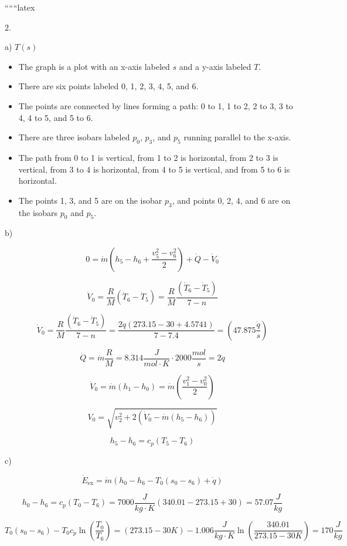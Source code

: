 
``````latex


2.

a) \( T(s) \)

\begin{itemize}
    \item The graph is a plot with an x-axis labeled \( s \) and a y-axis labeled \( T \).
    \item There are six points labeled 0, 1, 2, 3, 4, 5, and 6.
    \item The points are connected by lines forming a path: 0 to 1, 1 to 2, 2 to 3, 3 to 4, 4 to 5, and 5 to 6.
    \item There are three isobars labeled \( p_0 \), \( p_3 \), and \( p_5 \) running parallel to the x-axis.
    \item The path from 0 to 1 is vertical, from 1 to 2 is horizontal, from 2 to 3 is vertical, from 3 to 4 is horizontal, from 4 to 5 is vertical, and from 5 to 6 is horizontal.
    \item The points 1, 3, and 5 are on the isobar \( p_3 \), and points 0, 2, 4, and 6 are on the isobars \( p_0 \) and \( p_5 \).
\end{itemize}

b)

\[
0 = \dot{m} (h_5 - h_6 + \frac{v_5^2 - v_6^2}{2}) + \dot{Q} - \dot{V}_0
\]

\[
\dot{V}_0 = \frac{R}{M} (\dot{T}_6 - \dot{T}_5) = \frac{R}{M} \frac{(\dot{T}_6 - \dot{T}_5)}{7 - n}
\]

\[
\dot{V}_0 = \frac{R}{M} \frac{(\dot{T}_6 - \dot{T}_5)}{7 - n} = \frac{2 \dot{q} (273.15 - 30 + 4.5741)}{7 - 7.4} = (47.875 \frac{\dot{q}}{s})
\]

\[
\dot{Q} = \dot{m} \frac{R}{M} = 8.314 \frac{J}{mol \cdot K} \cdot 2000 \frac{mol}{s} = 2 \dot{q}
\]

\[
\dot{V}_0 = \dot{m} (h_1 - h_0) = \dot{m} (\frac{v_1^2 - v_0^2}{2})
\]

\[
V_0 = \sqrt{v_2^2 + 2 (\dot{V}_0 - \dot{m} (h_5 - h_6))}
\]

\[
h_5 - h_6 = c_p (T_5 - T_6)
\]

c)

\[
\dot{E}_{\text{ex}} = \dot{m} (h_0 - h_6 - T_0 (s_0 - s_6) + \dot{q})
\]

\[
h_0 - h_6 = c_p (T_0 - T_6) = 7000 \frac{J}{kg \cdot K} (340.01 - 273.15 + 30) = 57.07 \frac{J}{kg}
\]

\[
T_0 (s_0 - s_6) - T_0 c_p \ln \left( \frac{T_0}{T_6} \right) = (273.15 - 30 K) - 1.006 \frac{J}{kg \cdot K} \ln \left( \frac{340.01}{273.15 - 30 K} \right) = 170 \frac{J}{kg}
\]

